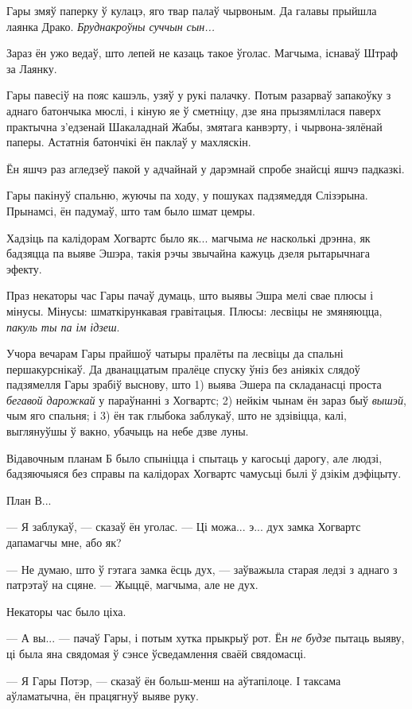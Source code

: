 Гары змяў паперку ў кулацэ, яго твар палаў чырвоным. Да галавы прыйшла 
лаянка Драко. \emph{Бруднакроўны суччын сын...}

Зараз ён ужо ведаў, што лепей не казаць такое ўголас. Магчыма, існаваў
Штраф за Лаянку.

Гары павесіў на пояс кашэль, узяў у рукі палачку. Потым разарваў запакоўку
з аднаго батончыка мюслі, і кіную яе ў сметніцу, дзе яна прызямлілася паверх
практычна з'едзенай Шакаладнай Жабы, змятага канвэрту, і чырвона-зялёнай 
паперы. Астатнія батончікі ён паклаў у махляскін.

Ён яшчэ раз агледзеў пакой у адчайнай у дарэмнай спробе знайсці яшчэ падказкі. 

Гары пакінуў спальню, жуючы па ходу, у пошуках падзямеддя Слізэрына. 
Прынамсі, ён падумаў, што там было шмат цемры.

Хадзіць па калідорам Хогвартс было як... магчыма \emph{не} насколькі дрэнна, як 
бадзяцца па выяве Эшэра, такія рэчы звычайна кажуць дзеля рытарычнага эфекту.

Праз некаторы час Гары пачаў думаць, што выявы Эшра мелі свае плюсы і мінусы.
Мінусы: шматкірункавая гравітацыя. Плюсы: лесвіцы не змяняюцца, \emph{пакуль ты па 
ім ідзеш}.

Учора вечарам Гары прайшоў чатыры пралёты па лесвіцы да спальні першакурснікаў.
Да дванаццатым пралёце спуску ўніз без аніякіх слядоў падзямелля Гары зрабіў 
выснову, што 1) выява Эшера па складанасці проста \emph{бегавой дарожкай}
у параўнанні з Хогвартс; 2) нейкім чынам ён зараз быў \emph{вышэй}, чым яго спальня; і 3)
ён так глыбока заблукаў,  што не здзівіцца, калі, выглянуўшы ў вакно, убачыць на небе
дзве луны.

Відавочным планам Б было спыніцца і спытаць у кагосьці дарогу, але
людзі, бадзяючыяся без справы па калідорах Хогвартс чамусьці былі ў дзікім
дэфіцыту.

План В...

--- Я заблукаў, --- сказаў ён уголас. --- Ці можа... э... дух замка Хогвартс
дапамагчы мне, або як?

--- Не думаю, што ў гэтага замка ёсць дух, --- заўважыла старая ледзі з аднаго з 
патрэтаў на сцяне. --- Жыццё, магчыма, але не дух.

Некаторы час было ціха.

--- А вы... --- пачаў Гары, і потым хутка прыкрыў рот. Ён \emph{не будзе} пытаць 
выяву, ці была яна свядомая ў сэнсе ўсведамлення сваёй свядомасці.

--- Я Гары Потэр, --- сказаў ён больш-менш на аўтапілоце. І таксама аўламатычна,
ён працягнуў выяве руку.


